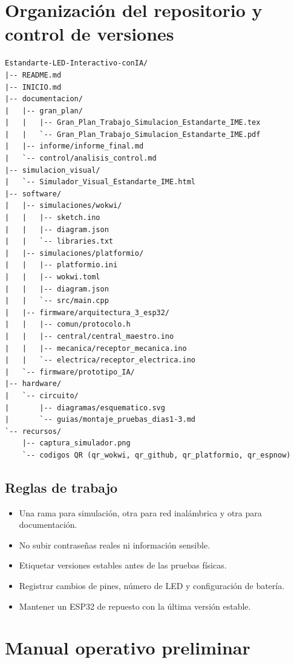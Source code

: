 \documentclass[11pt,a4paper]{article}
\begin{document}
\section{Organización del repositorio y control de versiones}
\begin{lstlisting}[style=code,language={},caption={Estructura del repositorio}]
Estandarte-LED-Interactivo-conIA/
|-- README.md
|-- INICIO.md
|-- documentacion/
|   |-- gran_plan/
|   |   |-- Gran_Plan_Trabajo_Simulacion_Estandarte_IME.tex
|   |   `-- Gran_Plan_Trabajo_Simulacion_Estandarte_IME.pdf
|   |-- informe/informe_final.md
|   `-- control/analisis_control.md
|-- simulacion_visual/
|   `-- Simulador_Visual_Estandarte_IME.html
|-- software/
|   |-- simulaciones/wokwi/
|   |   |-- sketch.ino
|   |   |-- diagram.json
|   |   `-- libraries.txt
|   |-- simulaciones/platformio/
|   |   |-- platformio.ini
|   |   |-- wokwi.toml
|   |   |-- diagram.json
|   |   `-- src/main.cpp
|   |-- firmware/arquitectura_3_esp32/
|   |   |-- comun/protocolo.h
|   |   |-- central/central_maestro.ino
|   |   |-- mecanica/receptor_mecanica.ino
|   |   `-- electrica/receptor_electrica.ino
|   `-- firmware/prototipo_IA/
|-- hardware/
|   `-- circuito/
|       |-- diagramas/esquematico.svg
|       `-- guias/montaje_pruebas_dias1-3.md
`-- recursos/
    |-- captura_simulador.png
    `-- codigos QR (qr_wokwi, qr_github, qr_platformio, qr_espnow)
\end{lstlisting}

\subsection{Reglas de trabajo}
\begin{itemize}
  \item Una rama para simulación, otra para red inalámbrica y otra para documentación.
  \item No subir contraseñas reales ni información sensible.
  \item Etiquetar versiones estables antes de las pruebas físicas.
  \item Registrar cambios de pines, número de LED y configuración de batería.
  \item Mantener un ESP32 de repuesto con la última versión estable.
\end{itemize}

\section{Manual operativo preliminar}
\end{document}
